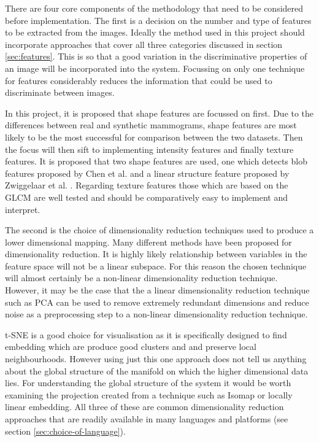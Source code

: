 There are four core components of the methodology that need to be considered before implementation. The first is a decision on the number and type of features to be extracted from the images. Ideally the method used in this project should incorporate approaches that cover all three categories discussed in section \ref{sec:features}. This is so that a good variation in the discriminative properties of an image will be incorporated into the system. Focussing on only one technique for features considerably reduces the information that could be used to discriminate between images. 

In this project, it is proposed that shape features are focussed on first. Due to the differences between real and synthetic mammograms, shape features are most likely to be the most successful for comparison between the two datasets. Then the focus will then sift to implementing intensity features and finally texture features. It is proposed that two shape features are used, one which detects blob features proposed by Chen et al. \cite{chen2013multiscale} and a linear structure feature proposed by Zwiggelaar et al. \cite{zwiggelaar1996finding}. Regarding texture features those which are based on the GLCM \cite{haralick1973textural} are well tested and should be comparatively easy to implement and interpret. 

The second is the choice of dimensionality reduction techniques used to produce a lower dimensional mapping. Many different methods have been proposed for dimensionality reduction. It is highly likely relationship between variables in the feature space will not be a linear subspace. For this reason the chosen technique will almost certainly be a non-linear dimensionality reduction technique. However, it may be the case that the a linear dimensionality reduction technique such as PCA can be used to remove extremely redundant dimensions and reduce noise as a preprocessing step to a non-linear dimensionality reduction technique. 

t-SNE is a good choice for visualisation as it is specifically designed to find embedding which are produce good clusters and and preserve local neighbourhoods. However using just this one approach does not tell us anything about the global structure of the manifold on which the higher dimensional data lies. For understanding the global structure of the system it would be worth examining the projection created from a technique such as Isomap or locally linear embedding. All three of these are common dimensionality reduction approaches that are readily available in many languages and platforms (see section \ref{sec:choice-of-language}).

